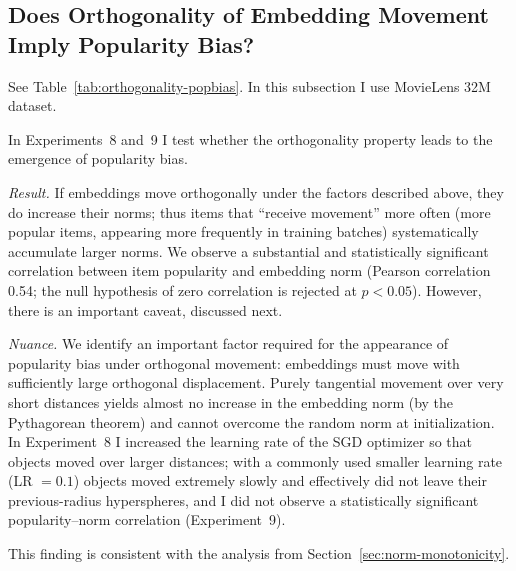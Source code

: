 \subsection{Does Orthogonality of Embedding Movement Imply Popularity Bias?}

See Table~\ref{tab:orthogonality-popbias}. In this subsection I use MovieLens 32M dataset.

In Experiments~8 and~9 I test whether the orthogonality property leads to the emergence of popularity bias. 

\textit{Result.} If embeddings move orthogonally under the factors described above, they do increase their norms; thus items that “receive movement” more often (more popular items, appearing more frequently in training batches) systematically accumulate larger norms. We observe a substantial and statistically significant correlation between item popularity and embedding norm (Pearson correlation 0.54; the null hypothesis of zero correlation is rejected at $p<0.05$). However, there is an important caveat, discussed next.

\textit{Nuance.} We identify an important factor required for the appearance of popularity bias under orthogonal movement: embeddings must move with sufficiently large orthogonal displacement. Purely tangential movement over very short distances yields almost no increase in the embedding norm (by the Pythagorean theorem) and cannot overcome the random norm at initialization. In Experiment~8 I increased the learning rate of the SGD optimizer so that objects moved over larger distances; with a commonly used smaller learning rate (LR $=0.1$) objects moved extremely slowly and effectively did not leave their previous-radius hyperspheres, and I did not observe a statistically significant popularity–norm correlation (Experiment~9).

This finding is consistent with the analysis from Section~\ref{sec:norm-monotonicity}.

